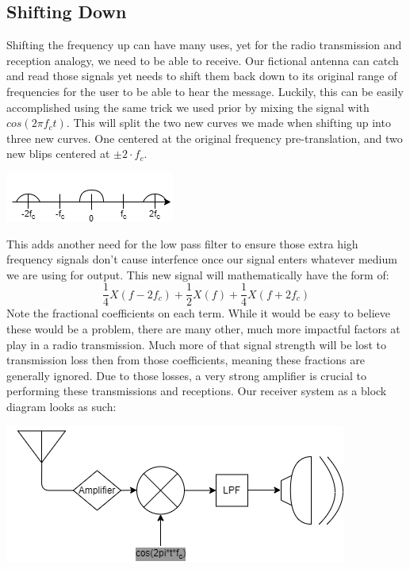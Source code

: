 \documentclass[12pt]{article}
\begin{document}
\subsection{Shifting Down}
Shifting the frequency up can have many uses, yet for the radio transmission and reception analogy, we need to be able to receive. Our fictional antenna can catch and read those signals yet needs to shift them back down to its original range of frequencies for the user to be able to hear the message. Luckily, this can be easily accomplished using the same trick we used prior by mixing the signal with $cos(2\pi f_c t)$. This will split the two new curves we made when shifting up into three new curves. One centered at the original frequency pre-translation, and two new blips centered at $\pm 2 \cdot f_c$. 
\begin{center}
\includegraphics[scale=1]{freqshiftbot}
\end{center}
This adds another need for the low pass filter to ensure those extra high frequency signals don't cause interfence once our signal enters whatever medium we are using for output. This new signal will mathematically have the form of: $$\frac{1}{4} X(f-2f_c) + \frac{1}{2} X(f) + \frac{1}{4} X(f+2f_c) $$
Note the fractional coefficients on each term. While it would be easy to believe these would be a problem, there are many other, much more impactful factors at play in a radio transmission. Much more of that signal strength will be lost to transmission loss then from those coefficients, meaning these fractions are generally ignored. Due to those losses, a very strong amplifier is crucial to performing these transmissions and receptions. Our receiver system as a block diagram looks as such:

\begin{center}
\includegraphics[scale=1]{radioReceiver}
\end{center}
\end{document}
